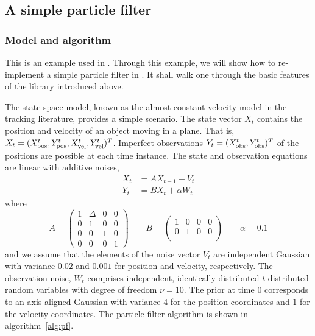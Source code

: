 \subsection{A simple particle filter}
\label{sub:A simple particle filter}

\subsubsection{Model and algorithm}
\label{ssub:Model and algorithm}

This is an example used in \textcite{Johansen:2009wd}. Through this example, we
will show how to re-implement a simple particle filter in \vsmc. It shall walk
one through the basic features of the library introduced above.

The state space model, known as the almost constant velocity model in the
tracking literature, provides a simple scenario. The state vector $X_t$
contains the position and velocity of an object moving in a plane. That is,
$X_t = (X_{\mathrm{pos}}^t, Y_{\mathrm{pos}}^t, X_{\mathrm{vel}}^t, Y_{\mathrm{vel}}^t)^T$. Imperfect observations $Y_t =
(X_{\mathrm{obs}}^t, Y_{\mathrm{obs}}^t)^T$ of the positions are possible at each time instance. The
state and observation equations are linear with additive noises,
\begin{align*}
  X_t &= AX_{t-1} + V_t \\
  Y_t &= BX_t + \alpha W_t
\end{align*}
where
\begin{equation*}
  A = \begin{pmatrix}
    1 & \Delta & 0 & 0 \\
    0 & 1 & 0 & 0 \\
    0 & 0 & 1 & 0 \\
    0 & 0 & 0 & 1
  \end{pmatrix} \qquad
  B = \begin{pmatrix}
    1 & 0 & 0 & 0 \\
    0 & 1 & 0 & 0 \\
  \end{pmatrix} \qquad
  \alpha = 0.1
\end{equation*}
and we assume that the elements of the noise vector $V_t$ are independent
Gaussian with variance $0.02$ and $0.001$ for position and velocity,
respectively. The observation noise, $W_t$ comprises independent, identically
distributed $t$-distributed random variables with degree of freedom $\nu = 10$.
The prior at time $0$ corresponds to an axis-aligned Gaussian with variance $4$
for the position coordinates and $1$ for the velocity coordinates. The particle
filter algorithm is shown in algorithm~\ref{alg:pf}.


